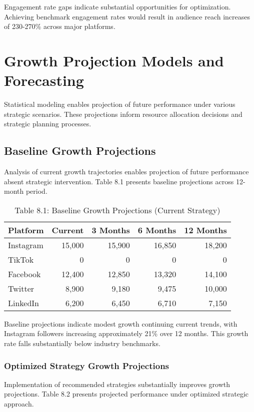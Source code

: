\documentclass[12pt]{report}
\begin{document}
Engagement rate gaps indicate substantial opportunities for optimization. Achieving benchmark engagement rates would result in audience reach increases of 230-270\% across major platforms.

\chapter{Growth Projection Models and Forecasting}

Statistical modeling enables projection of future performance under various strategic scenarios. These projections inform resource allocation decisions and strategic planning processes.

\section{Baseline Growth Projections}

Analysis of current growth trajectories enables projection of future performance absent strategic intervention. Table 8.1 presents baseline projections across 12-month period.

\begin{table}[h]
\centering
\caption{Table 8.1: Baseline Growth Projections (Current Strategy)}
\begin{tabular}{@{}lrrrr@{}}
\toprule
\textbf{Platform} & \textbf{Current} & \textbf{3 Months} & \textbf{6 Months} & \textbf{12 Months} \\
\midrule
Instagram & 15,000 & 15,900 & 16,850 & 18,200 \\
TikTok & 0 & 0 & 0 & 0 \\
Facebook & 12,400 & 12,850 & 13,320 & 14,100 \\
Twitter & 8,900 & 9,180 & 9,475 & 10,000 \\
LinkedIn & 6,200 & 6,450 & 6,710 & 7,150 \\
\bottomrule
\end{tabular}
\end{table}

Baseline projections indicate modest growth continuing current trends, with Instagram followers increasing approximately 21\% over 12 months. This growth rate falls substantially below industry benchmarks.

\subsection{Optimized Strategy Growth Projections}

Implementation of recommended strategies substantially improves growth projections. Table 8.2 presents projected performance under optimized strategic approach.
\end{document}
